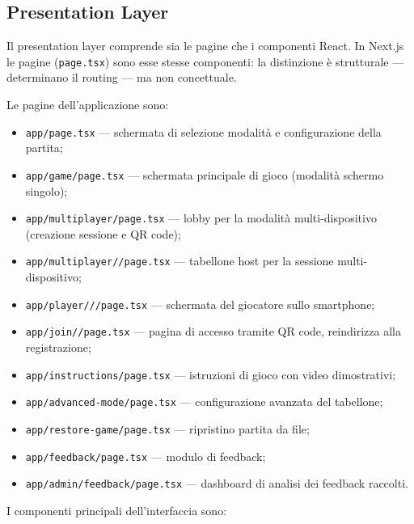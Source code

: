 \documentclass[12pt]{report}
\begin{document}
\subsection{Presentation Layer}

Il presentation layer comprende sia le pagine che i componenti React.
In Next.js le pagine (\texttt{page.tsx}) sono esse stesse componenti: la distinzione è strutturale --- determinano il routing --- ma non concettuale.

Le pagine dell'applicazione sono:

\begin{itemize}
    \item \texttt{app/page.tsx} --- schermata di selezione modalità e configurazione della partita;
    \item \texttt{app/game/page.tsx} --- schermata principale di gioco (modalità schermo singolo);
    \item \texttt{app/multiplayer/page.tsx} --- lobby per la modalità multi-dispositivo (creazione sessione e QR code);
    \item \texttt{app/\allowbreak multiplayer/\allowbreak[sessionId]/\allowbreak page.tsx} --- tabellone host per la sessione multi-dispositivo;
    \item \texttt{app/\allowbreak player/\allowbreak[sessionId]/\allowbreak[playerId]/\allowbreak page.tsx} --- schermata del giocatore sullo smartphone;
    \item \texttt{app/\allowbreak join/\allowbreak[sessionId]/\allowbreak page.tsx} --- pagina di accesso tramite QR code, reindirizza alla registrazione;
    \item \texttt{app/instructions/page.tsx} --- istruzioni di gioco con video dimostrativi;
    \item \texttt{app/advanced-mode/page.tsx} --- configurazione avanzata del tabellone;
    \item \texttt{app/restore-game/page.tsx} --- ripristino partita da file;
    \item \texttt{app/feedback/page.tsx} --- modulo di feedback;
    \item \texttt{app/admin/feedback/page.tsx} --- dashboard di analisi dei feedback raccolti.
\end{itemize}

I componenti principali dell'interfaccia sono:
\end{document}
